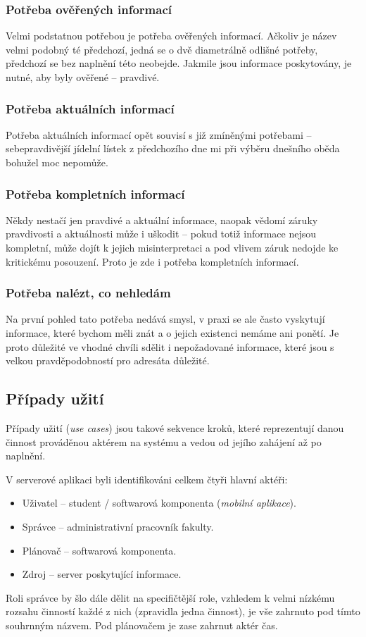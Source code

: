 \subsubsection{Potřeba ověřených informací}
Velmi podstatnou potřebou je potřeba ověřených informací. Ačkoliv je název velmi podobný té předchozí, jedná se o dvě diametrálně odlišné potřeby, předchozí se bez naplnění této neobejde. Jakmile jsou informace poskytovány, je nutné, aby byly ověřené -- pravdivé.

\subsubsection{Potřeba aktuálních informací}
Potřeba aktuálních informací opět souvisí s již zmíněnými potřebami -- sebepravdivější jídelní lístek z předchozího dne mi při výběru dnešního oběda bohužel moc nepomůže.

\subsubsection{Potřeba kompletních informací}
Někdy nestačí jen pravdivé a aktuální informace, naopak vědomí záruky pravdivosti a aktuálnosti může i uškodit -- pokud totiž informace nejsou kompletní, může dojít k jejich misinterpretaci a pod vlivem záruk nedojde ke kritickému posouzení. Proto je zde i potřeba kompletních informací.

\subsubsection{Potřeba nalézt, co nehledám}
Na první pohled tato potřeba nedává smysl, v praxi se ale často vyskytují informace, které bychom měli znát a o jejich existenci nemáme ani ponětí. Je proto důležité ve vhodné chvíli sdělit i nepožadované informace, které jsou s velkou pravděpodobností pro adresáta důležité.


\subsection{Případy užití}
Případy užití (\textit{use cases}) jsou takové sekvence kroků, které reprezentují danou činnost prováděnou aktérem na systému a vedou od jejího zahájení až po naplnění.

V serverové aplikaci byli identifikováni celkem čtyři hlavní aktéři:
\begin{itemize}
 \item Uživatel -- student / softwarová komponenta (\textit{mobilní aplikace}).
 \item Správce -- administrativní pracovník fakulty.
 \item Plánovač -- softwarová komponenta.
 \item Zdroj -- server poskytující informace.
\end{itemize}
Roli správce by šlo dále dělit na specifičtější role, vzhledem k velmi nízkému rozsahu činností každé z nich (zpravidla jedna činnost), je vše zahrnuto pod tímto souhrnným názvem. Pod plánovačem je zase zahrnut aktér čas.

